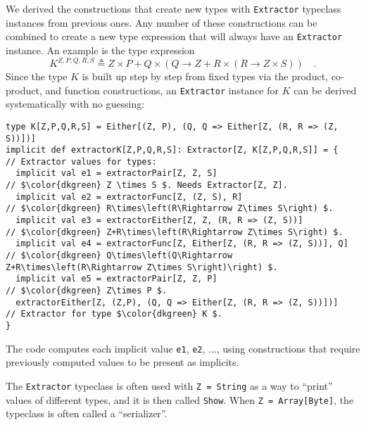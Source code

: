 We derived the constructions that create new types with \lstinline!Extractor!
typeclass instances from previous ones. Any number of these constructions
can be combined to create a new type expression that will always have
an \lstinline!Extractor! instance. An example is the type expression
\[
K^{Z,P,Q,R,S}\triangleq Z\times P+Q\times\left(Q\rightarrow Z+R\times\left(R\rightarrow Z\times S\right)\right)\quad.
\]
Since the type $K$ is built up step by step from fixed types via
the product, co-product, and function constructions, an \lstinline!Extractor!
instance for $K$ can be derived systematically with no guessing:
\begin{lstlisting}[mathescape=true]
type K[Z,P,Q,R,S] = Either[(Z, P), (Q, Q => Either[Z, (R, R => (Z, S))])]
implicit def extractorK[Z,P,Q,R,S]: Extractor[Z, K[Z,P,Q,R,S]] = {   // Extractor values for types:
  implicit val e1 = extractorPair[Z, Z, S]                           // $\color{dkgreen} Z \times S $. Needs Extractor[Z, Z].
  implicit val e2 = extractorFunc[Z, (Z, S), R]                      // $\color{dkgreen} R\times\left(R\Rightarrow Z\times S\right) $.
  implicit val e3 = extractorEither[Z, Z, (R, R => (Z, S))]          // $\color{dkgreen} Z+R\times\left(R\Rightarrow Z\times S\right) $.
  implicit val e4 = extractorFunc[Z, Either[Z, (R, R => (Z, S))], Q] // $\color{dkgreen} Q\times\left(Q\Rightarrow Z+R\times\left(R\Rightarrow Z\times S\right)\right) $.
  implicit val e5 = extractorPair[Z, Z, P]                           // $\color{dkgreen} Z\times P $.
  extractorEither[Z, (Z,P), (Q, Q => Either[Z, (R, R => (Z, S))])]   // Extractor for type $\color{dkgreen} K $.
}
\end{lstlisting}
The code computes each implicit value \lstinline!e1!, \lstinline!e2!,
..., using constructions that require previously computed values to
be present as implicits.

The \lstinline!Extractor! typeclass is often used with \lstinline!Z = String!
as a way to \textsf{``}print\textsf{''} values of different types, and it is then
called \lstinline!Show!. When
\lstinline!Z = Array[Byte]!, the typeclass is often called a \textsf{``}serializer\textsf{''}. 

